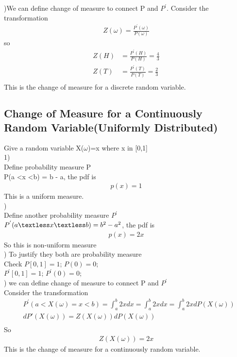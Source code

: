 \documentclass[a4paper]{article}
\begin{document}
)We can define change of measure to connect P and $P^{'}$. Consider the transformation 
\begin{align*}
	Z(\omega) = \frac{P^{'}(\omega)}{P(\omega)}
\end{align*}
so 
\begin{align*}
	Z(H) & = \frac{P^{'}(H)}{P(H)} = \frac{4}{3}\\
	Z(T) & = \frac{P^{'}(T)}{P(T)} = \frac{2}{3}\\
\end{align*}
This is the change of measure for a discrete random variable. \\
\subsection{Change of Measure for a Continuously Random Variable(Uniformly Distributed) } 
Give a random variable  X($\omega$)=x where x in [0,1]\\
1)\\
Define probability measure P \\
P(a \textless x \textless b) = b - a, the pdf is 
\begin{align*}
p(x) = 1	
\end{align*}
This is a uniform measure.\\

)\\
Define another probability measure $P^{'}$\\
$P^{'}(a \textless x  \textless b) = b^2 - a^2$, the pdf is 
\begin{align*}
p(x) = 2x
\end{align*}
So this is non-uniform measure\\


)	To justify they both are probability measure\\
Check  $P[0,1] = 1$; $P(0)=0$;\\
       $P^{'}[0,1] =1$; $P^{'}(0)=0$;\\


) we can define change of measure to connect P and $P^{'}$ \\
Consider the transformation \\
\begin{align*}
	&P^{'}(a < X(\omega) = x < b) = \int _a ^b 2x dx = \int _a ^b 2x dx = \int_a ^b 2x dP(X(\omega))\\
	&dP{'}(X(\omega)) = Z(X(\omega)) dP(X(\omega)) \\
\end{align*}
So
\begin{align*}
	Z(X(\omega))= 2x
\end{align*}
This is the change of measure for a continuously random variable. \\
\end{document}
